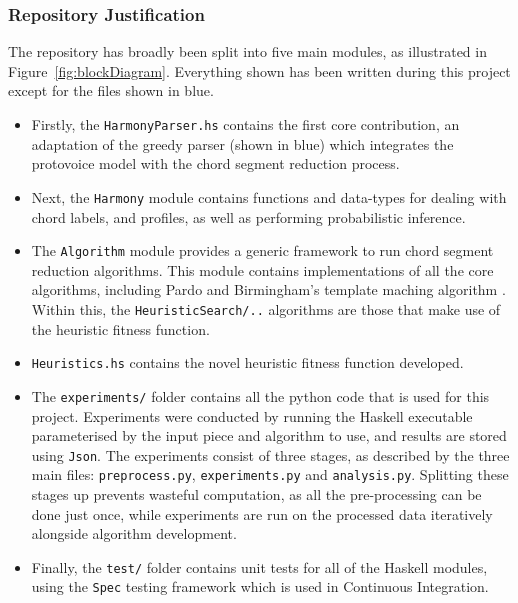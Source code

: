 \documentclass[12pt,a4paper,twoside,openany]{report} \usepackage[pdfborder={0 0 0}]{hyperref}    %
\theoremstyle{definition} \newtheorem{definition}{Definition}[section]
\begin{document}
    \subsubsection{Repository Justification}

    The repository has broadly been split into five main modules, as illustrated in Figure~\ref{fig:blockDiagram}.
    Everything shown has been written during this project except for the files shown in blue.
    \begin{itemize} 
      \item Firstly, the \texttt{HarmonyParser.hs} contains the first core contribution, an adaptation of the greedy
        parser (shown in blue) which integrates the protovoice model with the chord segment reduction process.
      \item Next, the \texttt{Harmony} module contains functions and data-types for dealing with chord labels, and
        profiles, as well as performing probabilistic inference. 
      \item The \texttt{Algorithm} module provides a generic framework to run chord segment reduction algorithms. This
        module contains implementations of all the core algorithms, including Pardo and Birmingham's template maching
        algorithm \cite{pardoAlgorithmsChordalAnalysis2002}. Within this, the \texttt{HeuristicSearch/..} algorithms are
        those that make use of the heuristic fitness function.
      \item \texttt{Heuristics.hs} contains the novel heuristic fitness function developed. 
      \item The \texttt{experiments/} folder contains all the python code that is used for this project. Experiments
        were conducted by running the Haskell executable parameterised by the input piece and algorithm to use, and
        results are stored using \texttt{Json}. The experiments consist of three stages, as described by the three main files: \texttt{preprocess.py}, \texttt{experiments.py} and \texttt{analysis.py}. 
        Splitting these stages up prevents wasteful computation, as all the pre-processing can be done just once, while experiments are run on the processed data iteratively alongside algorithm development. 
      \item Finally, the \texttt{test/} folder contains unit tests for all of the Haskell modules, using the
        \texttt{Spec} testing framework which is used in Continuous Integration. 
    \end{itemize}
\end{document}
